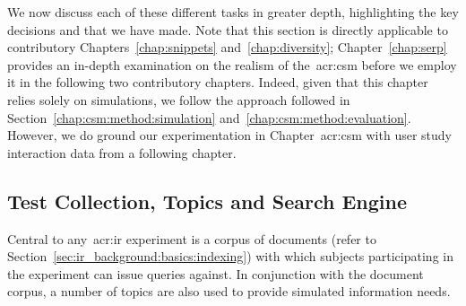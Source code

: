We now discuss each of these different tasks in greater depth, highlighting the key decisions and  that we have made. Note that this section is directly applicable to contributory Chapters~\ref{chap:snippets} and~\ref{chap:diversity}; Chapter~\ref{chap:serp} provides an in-depth examination on the realism of the~\gls{acr:csm} before we employ it in the following two contributory chapters. Indeed, given that this chapter relies solely on simulations, we follow the approach followed in Section~\ref{chap:csm:method:simulation} and~\ref{chap:csm:method:evaluation}. However, we do ground our experimentation in Chapter~\gls{acr:csm} with user study interaction data from a following chapter.

%
%
%
%
%
%
%

\subsection{Test Collection, Topics and Search Engine}\label{sec:csm:methodology:collection}
Central to any~\gls{acr:ir} experiment is a corpus of documents (refer to Section~\ref{sec:ir_background:basics:indexing}) with which subjects participating in the experiment can issue queries against. In conjunction with the document corpus, a number of topics are also used to provide simulated information needs.


